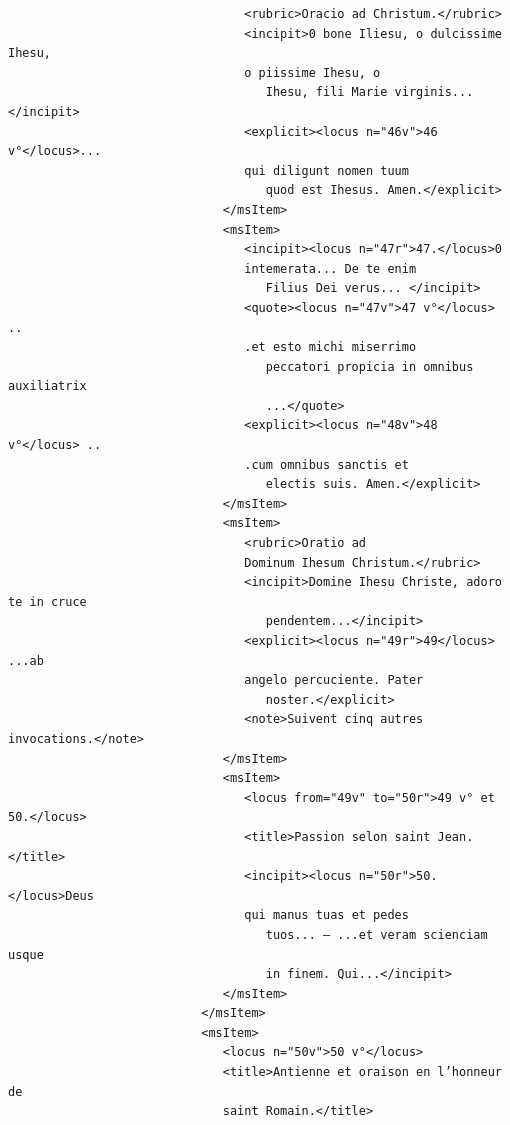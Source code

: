 \documentclass[a4paper,12pt,twoside]{book}
\begin{document}
\begin{verbatim}
                                 <rubric>Oracio ad Christum.</rubric>
                                 <incipit>0 bone Iliesu, o dulcissime Ihesu,
                                 o piissime Ihesu, o
                                    Ihesu, fili Marie virginis...</incipit>
                                 <explicit><locus n="46v">46 v°</locus>...
                                 qui diligunt nomen tuum
                                    quod est Ihesus. Amen.</explicit>
                              </msItem>
                              <msItem>
                                 <incipit><locus n="47r">47.</locus>0 
                                 intemerata... De te enim
                                    Filius Dei verus... </incipit>
                                 <quote><locus n="47v">47 v°</locus> ..
                                 .et esto michi miserrimo
                                    peccatori propicia in omnibus auxiliatrix
                                    ...</quote>
                                 <explicit><locus n="48v">48 v°</locus> ..
                                 .cum omnibus sanctis et
                                    electis suis. Amen.</explicit>
                              </msItem>
                              <msItem>
                                 <rubric>Oratio ad
                                 Dominum Ihesum Christum.</rubric>
                                 <incipit>Domine Ihesu Christe, adoro te in cruce
                                    pendentem...</incipit>
                                 <explicit><locus n="49r">49</locus> ...ab 
                                 angelo percuciente. Pater
                                    noster.</explicit>
                                 <note>Suivent cinq autres invocations.</note>
                              </msItem>
                              <msItem>
                                 <locus from="49v" to="50r">49 v° et 50.</locus>
                                 <title>Passion selon saint Jean.</title>
                                 <incipit><locus n="50r">50.</locus>Deus 
                                 qui manus tuas et pedes
                                    tuos... — ...et veram scienciam usque 
                                    in finem. Qui...</incipit>
                              </msItem>
                           </msItem>
                           <msItem>
                              <locus n="50v">50 v°</locus>
                              <title>Antienne et oraison en l’honneur de 
                              saint Romain.</title>

\end{verbatim}
\end{document}
